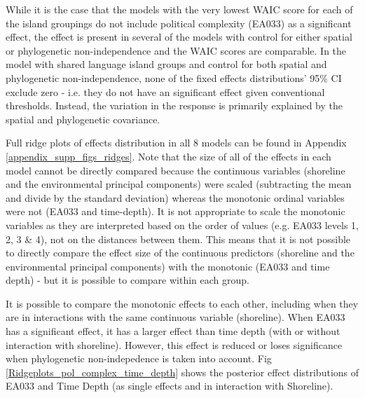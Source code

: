 \documentclass[unnumsec,webpdf,modern,medium]{oup-authoring-template}
\begin{document}


While it is the case that the models with the very lowest WAIC score for each of the island groupings do not include political complexity (EA033) as a significant effect, the effect is present in several of the models with control for either spatial or phylogenetic non-independence and the WAIC scores are comparable. In the model with shared language island groups and control for both spatial and phylogenetic non-independence, none of the fixed effects distributions' 95\% CI exclude zero - i.e. they do not have an significant effect given conventional thresholds. Instead, the variation in the response is primarily explained by the spatial and phylogenetic covariance.

Full ridge plots of effects distribution in all 8 models can be found in Appendix \ref{appendix_supp_figs_ridges}. Note that the size of all of the effects in each model cannot be directly compared because the continuous variables (shoreline and the environmental principal components) were scaled (subtracting the mean and divide by the standard deviation) whereas the monotonic ordinal variables were not (EA033 and time-depth). It is not appropriate to scale the monotonic variables as they are interpreted based on the order of values (e.g. EA033 levels 1, 2, 3 \& 4), not on the distances between them. This means that it is not possible to directly compare the effect size of the continuous predictors (shoreline and the environmental principal components) with the monotonic (EA033 and time depth) - but it is possible to compare within each group.

It is possible to compare the monotonic effects to each other, including when they are in interactions with the same continuous variable (shoreline). When EA033 has a significant effect, it has a larger effect than time depth (with or without interaction with shoreline). However, this effect is reduced or loses significance when phylogenetic non-indepedence is taken into account. Fig \ref{Ridgeplots_pol_complex_time_depth} shows the posterior effect distributions of EA033 and Time Depth (as single effects and in interaction with Shoreline).
\end{document}
